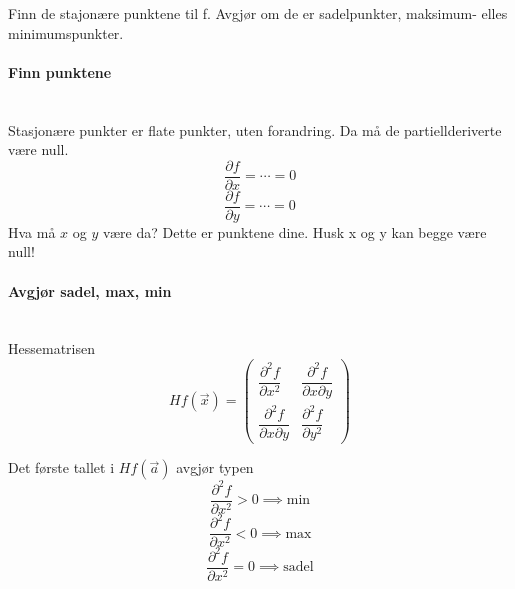 Finn de stajonære punktene til f.
Avgjør om de er sadelpunkter, maksimum- elles minimumspunkter.



\paragraph{Finn punktene} \mbox{} \\
Stasjonære punkter er flate punkter, uten forandring.
Da må de partiellderiverte være null.
$$\frac{\partial f}{\partial x} = \cdots = 0$$
$$\frac{\partial f}{\partial y} = \cdots = 0$$
Hva må $x$ og $y$ være da?
Dette er punktene dine.
Husk x og y kan begge være null!



\paragraph{Avgjør sadel, max, min} \mbox{} \\
Hessematrisen
$$Hf(\vec{x}) = \begin{pmatrix}
                \dfrac{\partial^2f}{\partial x^2}
                  & \dfrac{\partial^2f}{\partial x \partial y} \\[18pt]
                \dfrac{\partial^2f}{\partial x \partial y}
                  & \dfrac{\partial^2f}{\partial y^2}
                \end{pmatrix}$$

Det første tallet i $Hf(\vec{a})$ avgjør typen
$$\frac{\partial^2f}{\partial x^2} > 0 \implies \text{min}$$
$$\frac{\partial^2f}{\partial x^2} < 0 \implies \text{max}$$
$$\frac{\partial^2f}{\partial x^2} = 0 \implies \text{sadel}$$
